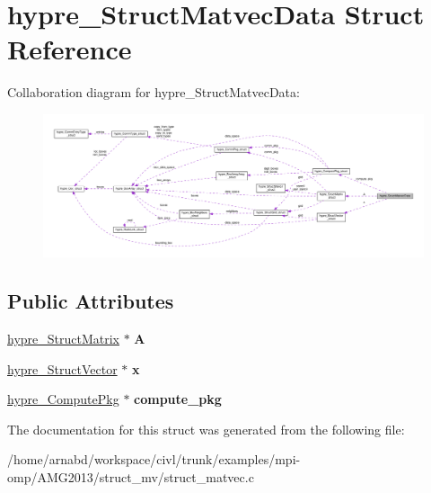 \hypertarget{structhypre__StructMatvecData}{}\section{hypre\+\_\+\+Struct\+Matvec\+Data Struct Reference}
\label{structhypre__StructMatvecData}


Collaboration diagram for hypre\+\_\+\+Struct\+Matvec\+Data\+:
\nopagebreak
\begin{figure}[H]
\begin{center}
\leavevmode
\includegraphics[width=350pt]{structhypre__StructMatvecData__coll__graph}
\end{center}
\end{figure}
\subsection*{Public Attributes}
\begin{DoxyCompactItemize}
\item 
\hypertarget{structhypre__StructMatvecData_ab9e87a7dc1af11cbf3d5d57e90febb92}{}\hyperlink{structhypre__StructMatrix__struct}{hypre\+\_\+\+Struct\+Matrix} $\ast$ {\bfseries A}\label{structhypre__StructMatvecData_ab9e87a7dc1af11cbf3d5d57e90febb92}

\item 
\hypertarget{structhypre__StructMatvecData_ac957306f97a2d4e2b6d8f9ed5a324167}{}\hyperlink{structhypre__StructVector__struct}{hypre\+\_\+\+Struct\+Vector} $\ast$ {\bfseries x}\label{structhypre__StructMatvecData_ac957306f97a2d4e2b6d8f9ed5a324167}

\item 
\hypertarget{structhypre__StructMatvecData_ac3846b5034383130a11c931306927a32}{}\hyperlink{structhypre__ComputePkg__struct}{hypre\+\_\+\+Compute\+Pkg} $\ast$ {\bfseries compute\+\_\+pkg}\label{structhypre__StructMatvecData_ac3846b5034383130a11c931306927a32}

\end{DoxyCompactItemize}


The documentation for this struct was generated from the following file\+:\begin{DoxyCompactItemize}
\item 
/home/arnabd/workspace/civl/trunk/examples/mpi-\/omp/\+A\+M\+G2013/struct\+\_\+mv/struct\+\_\+matvec.\+c\end{DoxyCompactItemize}
